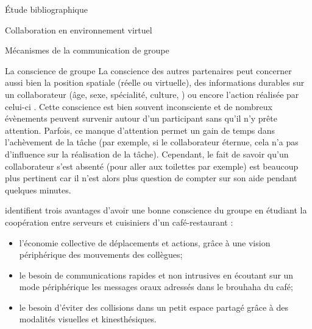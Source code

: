 \documentclass[myfrancais,ngerman,english,french]{mythesis}
\begin{document}
\begin{mychapter}{Étude bibliographique}
\begin{mysection}{Collaboration en environnement virtuel}
\begin{mysubsection}{Mécanismes de la communication de groupe}
\begin{mysubsubsection}{La conscience de groupe}
					La conscience des autres partenaires peut concerner aussi bien la position spatiale (réelle ou virtuelle), des informations durables sur un collaborateur (âge, sexe, spécialité, culture, \myetc) ou encore l'action réalisée par celui-ci .
					Cette conscience est bien souvent inconsciente et de nombreux évènements peuvent survenir autour d'un participant sans qu'il n'y prête attention.
					Parfois, ce manque d'attention permet un gain de temps dans l'achèvement de la tâche (par exemple, si le collaborateur éternue, cela n'a pas d'influence sur la réalisation de la tâche).
					Cependant, le fait de savoir qu'un collaborateur s'est absenté (pour aller aux toilettes par exemple) est beaucoup plus pertinent car il n'est alors plus question de compter sur son aide pendant quelques minutes.

					 identifient trois avantages d'avoir une bonne conscience du groupe en étudiant la coopération entre serveurs et cuisiniers d'un café-restaurant :
					\begin{itemize}
						\item l'économie collective de déplacements et actions, grâce à une vision périphérique des mouvements des collègues;
						\item le besoin de communications rapides et non intrusives en écoutant sur un mode périphérique les messages oraux adressés dans le brouhaha du café;
						\item le besoin d'éviter des collisions dans un petit espace partagé grâce à des modalités visuelles et kinesthésiques.
					\end{itemize}


\end{mysubsubsection}
\end{mysubsection}
\end{mysection}
\end{mychapter}
\end{document}
